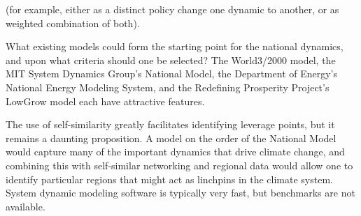  (for example, either as a distinct policy change one dynamic to another, or as weighted combination of both).

  \item What existing models could form the starting point for the national dynamics, and upon what criteria should one be selected?  The World3/2000 model, the MIT System Dynamics Group's National Model, the Department of Energy's National Energy Modeling System, and the Redefining Prosperity Project's LowGrow model each have attractive features.

The use of self-similarity greatly facilitates identifying leverage points, but it remains a daunting proposition.  A model on the order of the National Model would capture many of the important dynamics that drive climate change, and combining this with self-similar networking and regional data would allow one to identify particular regions that might act as linchpins in the climate system.  System dynamic modeling software is typically very fast, but benchmarks are not available.
